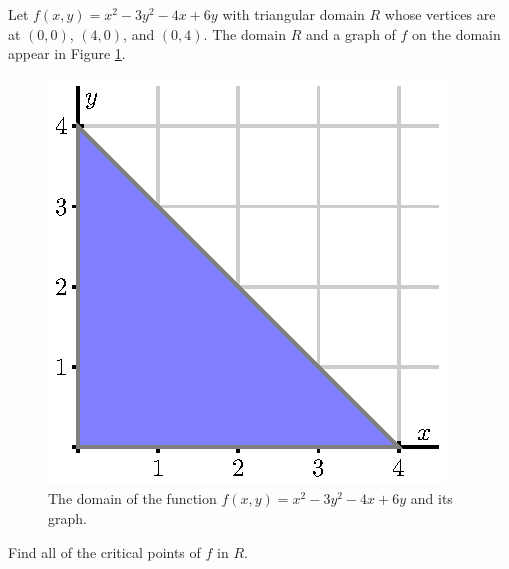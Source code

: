 \begin{activity} \label{A:10.7.6} Let $f(x,y) = x^2-3y^2-4x+6y$ with
  triangular domain $R$ whose vertices are at $(0,0)$, $(4,0)$, and
  $(0,4)$. The domain $R$ and a graph of $f$ on the domain appear
  in Figure \ref{F:10.7.Optimize_ex2}. 
  \begin{figure}[ht]
    \begin{center}
      \includegraphics{figures/fig_10_7_activity_optim_domain.eps}
      \hspace*{20pt}
    \end{center}
    \caption{The domain of the function $f(x,y) = x^2-3y^2-4x+6y$ and
      its graph.}
    \label{F:10.7.Optimize_ex2}
  \end{figure}
  \ba
\item Find all of the critical points of $f$ in $R$.
	

\end{activity}
